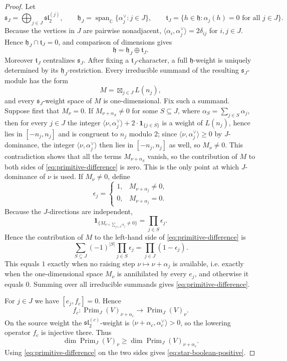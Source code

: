 \documentclass[11pt]{article}
\theoremstyle{definition}
\theoremstyle{remark}
\begin{document}
\begin{proof}
Let
\[
 \mathfrak s_J=\bigoplus_{j\in J}\mathfrak{sl}_2^{(j)},
 \qquad
 \mathfrak h_J=\operatorname{span}_{\mathbb C}
      \{\alpha_j^\vee:j\in J\},
 \qquad
 \mathfrak t_J=\{h\in\mathfrak h:\alpha_j(h)=0\text{ for all }j\in J\}.
\]
Because the vertices in $J$ are pairwise nonadjacent,
$\langle\alpha_i,\alpha_j^\vee\rangle=2\delta_{ij}$ for $i,j\in J$.
Hence $\mathfrak h_J\cap\mathfrak t_J=0$, and comparison of dimensions gives
\[
 \mathfrak h=\mathfrak h_J\oplus\mathfrak t_J.
\]
Moreover $\mathfrak t_J$ centralizes $\mathfrak s_J$.  After fixing a
$\mathfrak t_J$-character, a full $\mathfrak h$-weight is uniquely determined
by its $\mathfrak h_J$-restriction.  Every irreducible summand of the resulting
$\mathfrak s_J$-module has the form
\[
 M=\boxtimes_{j\in J}L(n_j),
\]
and every $\mathfrak s_J$-weight space of $M$ is one-dimensional.  Fix such a
summand.  Suppose first that $M_\nu=0$.  If $M_{\nu+\alpha_S}\ne0$ for some
$S\subseteq J$, where $\alpha_S=\sum_{j\in S}\alpha_j$, then for every
$j\in J$ the integer
$\langle\nu,\alpha_j^\vee\rangle+2\cdot\mathbf 1_{\{j\in S\}}$ is a weight
of $L(n_j)$, hence lies in $[-n_j,n_j]$ and is congruent to $n_j$ modulo $2$;
since $\langle\nu,\alpha_j^\vee\rangle\ge0$ by $J$-dominance, the integer
$\langle\nu,\alpha_j^\vee\rangle$ then lies in $[-n_j,n_j]$ as well, so
$M_\nu\ne0$.  This contradiction shows that all the terms $M_{\nu+\alpha_S}$
vanish, so the contribution of $M$ to both sides of
\eqref{eq:primitive-difference} is zero.  This is the only point at which
$J$-dominance of $\nu$ is used.  If $M_\nu\ne0$, define
\[
 \epsilon_j=
 \begin{cases}
 1,&M_{\nu+\alpha_j}\ne0,\\
 0,&M_{\nu+\alpha_j}=0.
 \end{cases}
\]
Because the $J$-directions are independent,
\[
 \mathbf 1_{\{M_{\nu+\sum_{j\in S}\alpha_j}\ne0\}}
      =\prod_{j\in S}\epsilon_j.
\]
Hence the contribution of $M$ to the left-hand side of
\eqref{eq:primitive-difference} is
\[
 \sum_{S\subseteq J}(-1)^{|S|}\prod_{j\in S}\epsilon_j
      =\prod_{j\in J}(1-\epsilon_j).
\]
This equals $1$ exactly when no raising step $\nu\mapsto\nu+\alpha_j$ is
available, i.e. exactly when the one-dimensional space $M_\nu$ is annihilated
by every $e_j$, and otherwise it equals $0$.  Summing over all irreducible
summands gives
\eqref{eq:primitive-difference}.

For $j\in J$ we have $[e_j,f_c]=0$.  Hence
\[
 f_c:\operatorname{Prim}_J(V)_{\nu+\alpha_c}
       \longrightarrow \operatorname{Prim}_J(V)_\nu.
\]
On the source weight the $\mathfrak{sl}_2^{(c)}$-weight is
$\langle\nu+\alpha_c,\alpha_c^\vee\rangle>0$, so the lowering operator $f_c$
is injective there.  Thus
\[
 \dim\operatorname{Prim}_J(V)_\nu
 \ge \dim\operatorname{Prim}_J(V)_{\nu+\alpha_c}.
\]
Using \eqref{eq:primitive-difference} on the two sides gives
\eqref{eq:star-boolean-positive}.
\end{proof}
\end{document}
